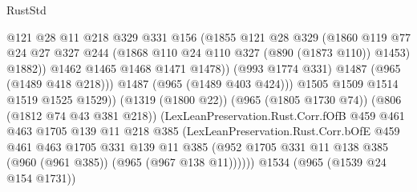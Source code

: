 \begin{lexlean}{RustStd}
\begin{coremodule}
                                  @121
                                  @28
                                  @11
                                  @218
                                  @329
                                  @331
                                  @156
                                  (@1855
                                    @121
                                    @28
                                    @329
                                    (@1860
                                      @119
                                      @77
                                      @24
                                      @27
                                      @327
                                      @244
                                      (@1868 @110 @24 @110 @327 (@890 (@1873 @110)) @1453)
                                      @1882))
                                  @1462
                                  @1465
                                  @1468
                                  @1471
                                  @1478))
                              (@993 @1774 @331)
                              @1487
                              (@965 (@1489 @418 @218)))
                            @1487
                            (@965 (@1489 @403 @424)))
                          @1505
                          @1509
                          @1514
                          @1519
                          @1525
                          @1529))
                      (@1319 (@1800 @22))
                      (@965 (@1805 @1730 @74))
                      (@806 (@1812 @74 @43 @381 @218))
                      (LexLeanPreservation.Rust.Corr.fOfB
                        @459
                        @461
                        @463
                        @1705
                        @139
                        @11
                        @218
                        @385
                        (LexLeanPreservation.Rust.Corr.bOfE
                          @459
                          @461
                          @463
                          @1705
                          @331
                          @139
                          @11
                          @385
                          (@952
                            @1705
                            @331
                            @11
                            @138
                            @385
                            (@960 (@961 @385))
                            (@965 (@967 @138 @11))))))
                    @1534
                    (@965 (@1539 @24 @154 @1731))

\end{coremodule}
\end{lexlean}
